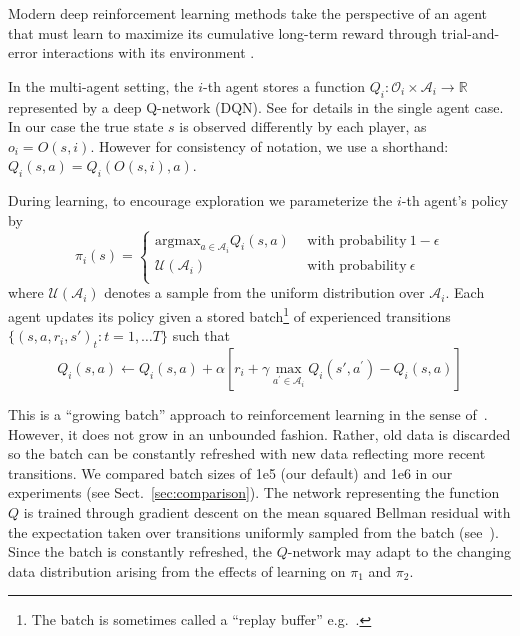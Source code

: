 \documentclass{aamas2017}
\newcommand{\bR}{\mathbb{R}}
\newcommand{\cA}{\mathcal{A}}
\newcommand{\cO}{\mathcal{O}}
\newcommand{\cU}{\mathcal{U}}
\begin{document}
Modern deep reinforcement learning methods take the perspective of an agent that must learn to maximize its cumulative long-term reward through trial-and-error interactions with its environment \cite{SuttonBarto:1998, Littman2015RL}.

In the multi-agent setting, the $i$-th agent stores a function $Q_i: \cO_i \times \cA_i \rightarrow \bR$ represented by a deep Q-network (DQN). See \cite{Mnih:2015} for details in the single agent case.
In our case the true state $s$ is observed differently by each player, as $o_i = O(s, i)$. However for consistency of notation, we use a shorthand: $Q_i(s,a) = Q_i(O(s,i), a)$.

During learning, to encourage exploration we parameterize the $i$-th agent's policy by
\begin{equation*}
 \pi_i(s) = \left\{ \begin{array}{ll}
                     \text{argmax}_{a \in \cA_i} Q_i(s, a) ~~ &\text{with probability} ~ 1 - \epsilon \\
                     \cU(\cA_i) ~~ &\text{with probability} ~ \epsilon \\
                    \end{array} \right.
\end{equation*}
where $\cU(\cA_i)$ denotes a sample from the uniform distribution over $\cA_i$.
Each agent updates its policy given a stored batch\footnote{The batch is sometimes called a ``replay buffer'' e.g.~\cite{Mnih:2015}.} of experienced transitions $\{(s, a, r_i, s')_t : t = 1, \dots T\}$ such that
\begin{equation*}
 Q_i(s, a) \gets Q_i(s, a) + \alpha \left[ r_i + \gamma \max_{a^\prime \in \cA_i}Q_i(s', a^\prime) - Q_i(s, a)\right]
\end{equation*}

This is a ``growing batch'' approach to reinforcement learning in the sense of~\cite{lange2012batch}. However, it does not grow in an unbounded fashion. Rather, old data is discarded so the batch can be constantly refreshed with new data reflecting more recent transitions. We compared batch sizes of 1e5 (our default) and 1e6 in our experiments (see Sect.~\ref{sec:comparison}).  The network representing the function $Q$ is trained through gradient descent on the mean squared Bellman residual with the expectation taken over transitions uniformly sampled from the batch (see~\cite{Mnih:2015}). Since the batch is constantly refreshed, the $Q$-network may adapt to the changing data distribution arising from the effects of learning on $\pi_1$ and $\pi_2$. 
\end{document}
